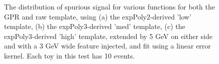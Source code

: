 \begin{figure} 
\begin{center}

\caption{The distribution of spurious signal for various functions for both the GPR and raw template, using (a) the expPoly2-derived 'low' template, (b) the expPoly3-derived 'med' template, (c) the expPoly3-derived 'high' template, extended by 5 GeV on either side and with a 3 GeV wide feature injected, and fit using a linear error kernel. Each toy in this test has 10 events.}
\label{fig:linearkernel_lowpt_10_Sig}
\end{center}
\end{figure}

